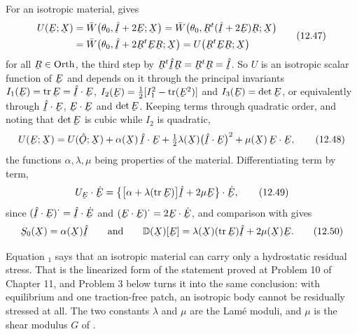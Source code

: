 For an isotropic material,  gives
\begin{equation}
\begin{aligned}
   U(\bE;\bX)&=\bar W\big(\theta_{0},\hI+2\bE;\bX\big)
   =\bar W\big(\theta_{0},\bR^{t}(\hI+2\bE)\bR;\bX\big)\\
   &=\bar W\big(\theta_{0},\hI+2\bR^{t}\bE\bR;\bX\big)
   =U\big(\bR^{t}\bE\bR;\bX\big)
\end{aligned}
   \tag{12.47}\label{eq:12.47}
\end{equation}
for all $\bR\in\Orth$, the third step by $\bR^{t}\hI\bR=\bR^{t}\bR=\hI$.
So $U$ is an isotropic scalar function of $\bE$ and depends on it
through the principal invariants $I_{1}(\bE)=\tr\bE=\hI\cdot\bE$,
$I_{2}(\bE)=\tfrac12[I^{2}_{1}-\tr(\bE^{2})]$ and $I_{3}(\bE)=\det\bE$,
or equivalently through $\hI\cdot\bE$, $\bE\cdot\bE$ and $\det\bE$.
Keeping terms through quadratic order, and noting that $\det\bE$ is
cubic while $I_{2}$ is quadratic,
\begin{equation}
   U(\bE;\bX)=U(\hOb;\bX)+\alpha(\bX)\,\hI\cdot\bE
   +\tfrac12\lambda(\bX)\big(\hI\cdot\bE\big)^{2}
   +\mu(\bX)\,\bE\cdot\bE ,
   \tag{12.48}\label{eq:12.48}
\end{equation}
the functions $\alpha,\lambda,\mu$ being properties of the material.
Differentiating term by term,
\begin{equation}
   U_{\bE}\cdot\dot\bE
   =\big\{\big[\alpha+\lambda(\tr\bE)\big]\hI+2\mu\bE\big\}\cdot\dot\bE ,
   \tag{12.49}\label{eq:12.49}
\end{equation}
since $(\hI\cdot\bE)^{\textstyle\cdot}=\hI\cdot\dot\bE$ and
$(\bE\cdot\bE)^{\textstyle\cdot}=2\bE\cdot\dot\bE$, and comparison with
 gives
\begin{equation}
   \bS_{0}(\bX)=\alpha(\bX)\hI
   \qquad\text{and}\qquad
   \mathbb{D}(\bX)[\bE]=\lambda(\bX)(\tr\bE)\hI+2\mu(\bX)\bE .
   \tag{12.50}\label{eq:12.50}
\end{equation}

\begin{remark}\label{rem:ch12resid}
Equation $_{1}$ says that an isotropic material can carry
only a hydrostatic residual stress. That is the linearized form of the
statement proved at Problem 10 of Chapter 11, and Problem 3 below turns
it into the same conclusion: with equilibrium and one traction-free
patch, an isotropic body cannot be residually stressed at all. The two
constants $\lambda$ and $\mu$ are the Lam\'e moduli, and $\mu$ is the
shear modulus $G$ of .
\end{remark}

